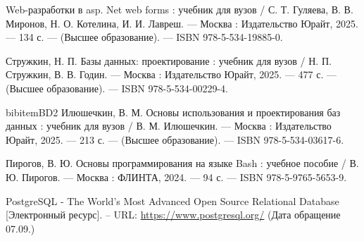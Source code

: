 
\renewcommand\bibname{СПИСОК ИСПОЛЬЗОВАННЫХ \hbox{ИСТОЧНИКОВ}}

\makeatletter
\renewcommand{\@biblabel}[1]{#1.}
\makeatother

\begin{thebibliography}{}

    Web-разработки в asp. Net web forms :
    учебник для вузов / С. Т. Гуляева, В. В. Миронов, Н. О. Котелина, И. И. Лавреш. — Москва :
    Издательство Юрайт, 2025. — 134 с. — (Высшее образование). — ISBN 978-5-534-19885-0.

    Стружкин, Н. П.  Базы данных: проектирование : учебник для вузов / Н. П. Стружкин, В. В. Годин. — Москва :
    Издательство Юрайт, 2025. — 477 с. — (Высшее образование). — ISBN 978-5-534-00229-4.
    
    bibitem{BD2}
    Илюшечкин, В. М.  Основы использования и проектирования баз данных :
    учебник для вузов / В. М. Илюшечкин. — Москва :
    Издательство Юрайт, 2025. — 213 с. — (Высшее образование). — ISBN 978-5-534-03617-6.

    Пирогов, В. Ю. Основы программирования на языке Bash :
    учебное пособие / В. Ю. Пирогов. — Москва :
    ФЛИНТА, 2024. — 94 с. — ISBN 978-5-9765-5653-9.

    PostgreSQL - The World's Most Advanced Open Source Relational Database [Электронный ресурс].
    -- URL: \url{https://www.postgresql.org/}
    (Дата обращение 07.09.\the\year)

\end{thebibliography}